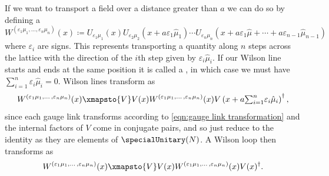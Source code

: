 \documentclass[fleqn]{NotesClass}
\newcommand{\hermit}{\dagger}
\begin{document}
    If we want to transport a field over a distance greater than \(a\) we can do so by defining a 
    \begin{equation}
        W^{(\varepsilon_1\mu_1, \dotso, \varepsilon_n\mu_n)}(x) \coloneqq U_{\varepsilon_1\mu_1}(x)U_{\varepsilon_2\mu_2}(x + a\varepsilon_1\hat{\mu}_1) \dotsm U_{\varepsilon_n\mu_n}(x + a\varepsilon_1\hat{\mu} + \dotsb + a\varepsilon_{n-1}\hat{\mu}_{n-1})
    \end{equation}
    where \(\varepsilon_i\) are signs.
    This represents transporting a quantity along \(n\) steps across the lattice with the direction of the \(i\)th step given by \(\varepsilon_i\hat{\mu}_i\).
    If our Wilson line starts and ends at the same position it is called a , in which case we must have \(\sum_{i=1}^{n} \varepsilon_i\hat{\mu}_i = 0\).
    Wilson lines transform as
    \begin{equation}
        W^{(\varepsilon_1\mu_1, \dotso, \varepsilon_n\mu_n)}(x) \xmapsto{V} V(x)W^{(\varepsilon_1\mu_1, \dotso, \varepsilon_n\mu_n)}(x)V\left( x + a{\textstyle\sum_{i=1}^{n}}\varepsilon_i\hat{\mu}_i \right)^\hermit,
    \end{equation}
    since each gauge link transforms according to \cref{eqn:gauge link transformation} and the internal factors of \(V\) come in conjugate pairs, and so just reduce to the identity as they are elements of \(\specialUnitary(N)\).
    A Wilson loop then transforms as
    \begin{equation}
        W^{(\varepsilon_1\mu_1, \dotso, \varepsilon_n\mu_n)}(x) \xmapsto{V} V(x)W^{(\varepsilon_1\mu_1, \dotso, \varepsilon_n\mu_n)}(x)V(x)^\hermit.
    \end{equation}
    
\end{document}
